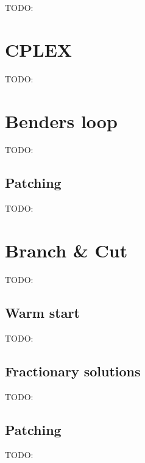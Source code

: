 TODO:
\section{CPLEX}
TODO:
\section{Benders loop}
TODO:
\subsection{Patching}
TODO:
\section{Branch \& Cut}
TODO:
\subsection{Warm start}
TODO:
\subsection{Fractionary solutions}
TODO:
\subsection{Patching}
TODO: